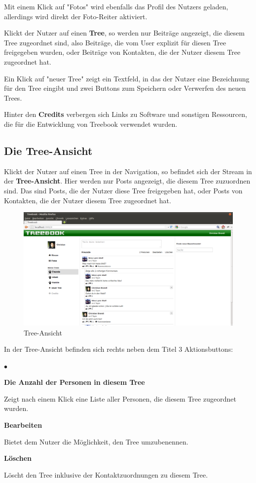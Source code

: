 \documentclass[10pt,a4paper]{book}
\makeatletter
\def\ScaleIfNeeded{%
\ifdim\Gin@nat@width>\linewidth
\linewidth
\else
\Gin@nat@width
\fi
}
\makeatother
\begin{document}
Mit einem Klick auf "Fotos" wird ebenfalls das Profil des Nutzers geladen, allerdings wird direkt der Foto-Reiter aktiviert.

Klickt der Nutzer auf einen \textbf{Tree}, so werden nur Beiträge angezeigt, die diesem Tree zugeordnet sind, also Beiträge, die vom User explizit für diesen Tree freigegeben wurden, oder Beiträge von Kontakten, die der Nutzer diesem Tree zugeordnet hat.

Ein Klick auf "neuer Tree" zeigt ein Textfeld, in das der Nutzer eine Bezeichnung für den Tree eingibt und zwei Buttons zum Speichern oder Verwerfen des neuen Trees.

Hinter den \textbf{Credits} verbergen sich Links zu Software und sonstigen Ressourcen, die für die Entwicklung von Treebook verwendet wurden.

\subsection{Die Tree-Ansicht}
Klickt der Nutzer auf einen Tree in der Navigation, so befindet sich der Stream in der \textbf{Tree-Ansicht}. Hier werden nur Posts angezeigt, die diesem Tree zuzuordnen sind. Das sind Posts, die der Nutzer diese Tree freigegeben hat, oder Posts von Kontakten, die der Nutzer diesem Tree zugeordnet hat.
\begin{figure}[htbp]
\centering
\includegraphics[width=\ScaleIfNeeded]{Pictures/screen_treeview.png}%
\caption{Tree-Ansicht}%
\end{figure}
In der Tree-Ansicht befinden sich rechts neben dem Titel 3 Aktionsbuttons:
\begin{list}{$\bullet$}{}
\item \textbf{Die Anzahl der Personen in diesem Tree}

Zeigt nach einem Klick eine Liste aller Personen, die diesem Tree zugeordnet wurden.
\item \textbf{Bearbeiten}

Bietet dem Nutzer die Möglichkeit, den Tree umzubenennen.
\item \textbf{Löschen}

Löscht den Tree inklusive der Kontaktzuordnungen zu diesem Tree.
\end{list}
\end{document}
